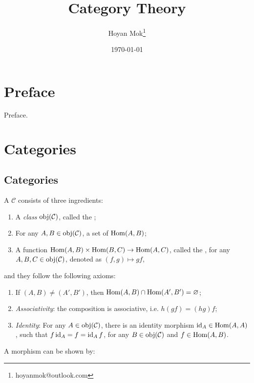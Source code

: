 \documentclass[openany, a5paper]{book}
\title{Category Theory}
\author{%
	Hoyan Mok\thanks{%
		hoyanmok@outlook.com
	}
}
\date{\today} %
\begin{document}
\maketitle %
\frontmatter
\chapter{Preface}
Preface.

\tableofcontents

\mainmatter
\chapter{Categories}
\section{Categories}

\begin{definition}[Category]
	A  $\mathcal C$ consists of three ingredients:
	\begin{enumerate}
		\item A \emph{class} $\operatorname{obj}(\mathcal C)$, called the ;
		\item For any $A, B \in \operatorname{obj}(\mathcal C)$, a set of  $\operatorname{Hom}(A, B)$;
		\item A function $\operatorname{Hom}(A, B) \times \operatorname{Hom}(B, C) \to \operatorname{Hom}(A, C)$, called the , for any $A, B, C \in \operatorname{obj}(\mathcal C)$, denoted as $(f, g) \mapsto gf$, 
	\end{enumerate}
	and they follow the following axioms:
	\begin{enumerate}[label=(\roman*)]
		\item If $(A, B) \neq (A', B')$, then $\operatorname{Hom}(A, B) \cap \operatorname{Hom}(A', B') = \varnothing$;
		\item \emph{Associativity}: the composition is associative, i.e. $h(gf) = (hg)f$;
		\item \emph{Identity}: For any $A \in \operatorname{obj}(\mathcal C)$, there is an identity morphism $\operatorname{id}_A \in \operatorname{Hom}(A, A)$, such that $f \operatorname{id}_A = f = \operatorname{id}_A f$, for any $B \in \operatorname{obj}(\mathcal C)$ and $f \in \operatorname{Hom}(A, B)$.
	\end{enumerate}
\end{definition}

A morphism can be shown by:
\end{document}
